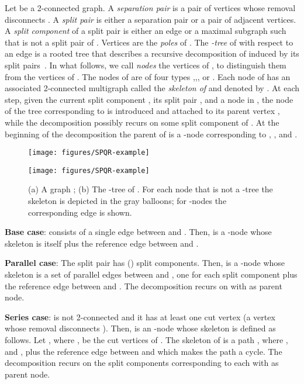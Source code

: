 \documentclass{article}
\begin{document}
Let  be a 2-connected graph.
A \emph{separation pair} is a pair of vertices whose removal disconnects .
A \emph{split pair} is either a separation pair or a pair of adjacent vertices.
A \emph{split component} of a split pair  is either an edge  or a maximal subgraph  such that  is not a split pair of .
Vertices  are the \emph{poles} of .
The \emph{-tree}  of  with respect to an edge  is a rooted tree that describes a recursive decomposition of  induced by its split pairs~\cite{DBLP:journals/siamcomp/BattistaT96}.
In what follows, we call \emph{nodes} the vertices of , to distinguish them from the vertices of .
The nodes of  are of four types ,,, or .
Each node  of  has an associated 2-connected multigraph called the \emph{skeleton of } and denoted by .
At each step, given the current split component , its split pair , and a node  in , the node  of the tree corresponding to  is introduced and attached to its parent vertex , while the decomposition possibly recurs on some split component of .
At the beginning of the decomposition the parent of  is a -node corresponding to , , and .

\begin{figure}
\centering
\begin{minipage}[b]{.3\textwidth}
    	\centering
    	\texttt{[image: figures/SPQR-example]}
    	\subcaption{}\label{fi:SPQR-example.1}
    \end{minipage}
    \begin{minipage}[b]{.65\textwidth}
    	\centering
    	\texttt{[image: figures/SPQR-example]}
    	\subcaption{}\label{fi:SPQR-example.2}
    \end{minipage}
\caption{\label{fi:SPQR-example}(a) A graph ; (b) The -tree  of . For each node that is not a -tree the skeleton is depicted in the gray balloons; for -nodes the corresponding edge is shown.}
\end{figure}


\textbf{Base case}:  consists of a single edge between  and . Then,  is a -node whose skeleton is  itself plus the reference edge between  and .

\textbf{Parallel case}: The split pair  has  () split components.
Then,  is a -node whose skeleton is a set of  parallel edges between  and , one for each split component  plus the reference edge between  and .
The decomposition recurs on  with  as parent node.

\textbf{Series case}:  is not 2-connected and it has at least one cut vertex (a vertex whose removal disconnects ).
Then,  is an -node whose skeleton is defined as follows.
Let , where , be the cut vertices of .
The skeleton of  is a path , where ,  and , plus the reference edge between  and  which makes the path a cycle.
The decomposition recurs on the split components corresponding to each  with  as parent node.
\end{document}
